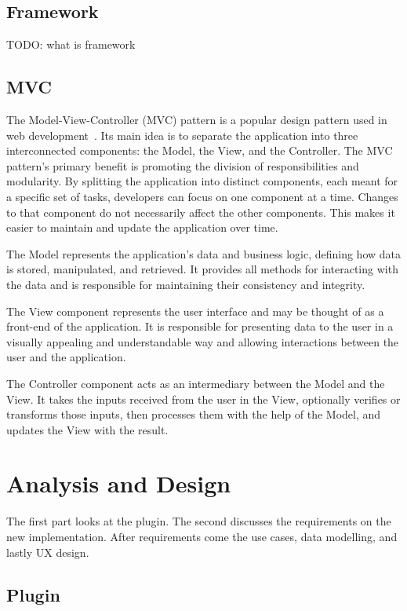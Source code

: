 \documentclass[
  digital,     %
  oneside,     %
  nosansbold,  %
  colorbold, %
  lof,         %
  lot,         %
]{fithesis4}
\begin{document}
\section{Framework}

TODO: what is framework

\section{MVC}

The Model-View-Controller (MVC) pattern is a popular design pattern used in web development~\cite{MVC}. Its main idea is to separate the application into three interconnected components: the Model, the View, and the Controller. The MVC pattern's primary benefit is promoting the division of responsibilities and modularity. By splitting the application into distinct components, each meant for a specific set of tasks, developers can focus on one component at a time. Changes to that component do not necessarily affect the other components. This makes it easier to maintain and update the application over time.

The Model represents the application's data and business logic, defining how data is stored, manipulated, and retrieved. It provides all methods for interacting with the data and is responsible for maintaining their consistency and integrity.

The View component represents the user interface and may be thought of as a front-end of the application. It is responsible for presenting data to the user in a visually appealing and understandable way and allowing interactions between the user and the application.

The Controller component acts as an intermediary between the Model and the View. It takes the inputs received from the user in the View, optionally verifies or transforms those inputs, then processes them with the help of the Model, and updates the View with the result.

\chapter{Analysis and Design}
\label{chap:analysis}

The first part looks at the plugin. The second discusses the requirements on the new implementation. After requirements come the use cases, data modelling, and lastly UX design.

\section{Plugin}
\label{sect:plugin}
\end{document}

